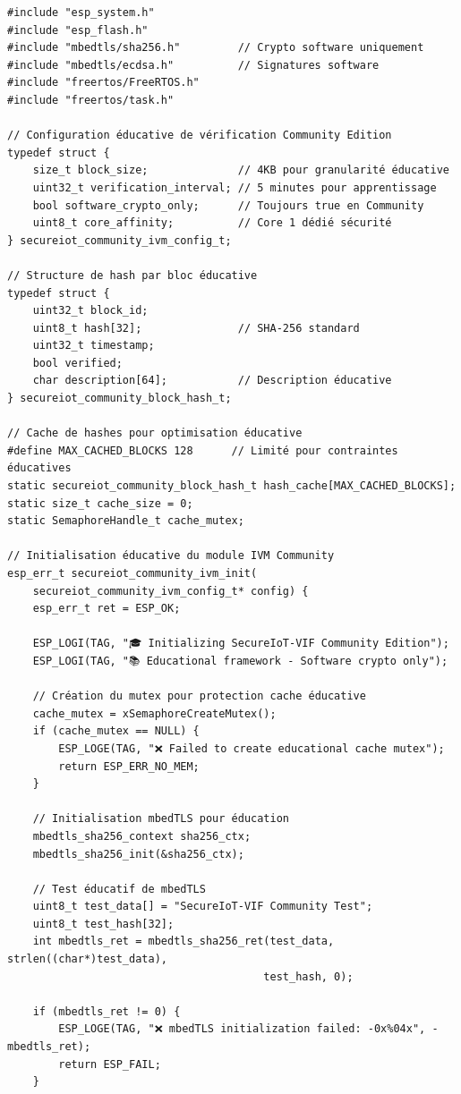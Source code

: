 \lstset{language=C}
\begin{lstlisting}[caption={Implémentation IVM Community utilisant mbedTLS}]
#include "esp_system.h"
#include "esp_flash.h"
#include "mbedtls/sha256.h"         // Crypto software uniquement
#include "mbedtls/ecdsa.h"          // Signatures software
#include "freertos/FreeRTOS.h"
#include "freertos/task.h"

// Configuration éducative de vérification Community Edition
typedef struct {
    size_t block_size;              // 4KB pour granularité éducative
    uint32_t verification_interval; // 5 minutes pour apprentissage
    bool software_crypto_only;      // Toujours true en Community
    uint8_t core_affinity;          // Core 1 dédié sécurité
} secureiot_community_ivm_config_t;

// Structure de hash par bloc éducative
typedef struct {
    uint32_t block_id;
    uint8_t hash[32];               // SHA-256 standard
    uint32_t timestamp;
    bool verified;
    char description[64];           // Description éducative
} secureiot_community_block_hash_t;

// Cache de hashes pour optimisation éducative
#define MAX_CACHED_BLOCKS 128      // Limité pour contraintes éducatives
static secureiot_community_block_hash_t hash_cache[MAX_CACHED_BLOCKS];
static size_t cache_size = 0;
static SemaphoreHandle_t cache_mutex;

// Initialisation éducative du module IVM Community
esp_err_t secureiot_community_ivm_init(
    secureiot_community_ivm_config_t* config) {
    esp_err_t ret = ESP_OK;
    
    ESP_LOGI(TAG, "🎓 Initializing SecureIoT-VIF Community Edition");
    ESP_LOGI(TAG, "📚 Educational framework - Software crypto only");
    
    // Création du mutex pour protection cache éducative
    cache_mutex = xSemaphoreCreateMutex();
    if (cache_mutex == NULL) {
        ESP_LOGE(TAG, "❌ Failed to create educational cache mutex");
        return ESP_ERR_NO_MEM;
    }
    
    // Initialisation mbedTLS pour éducation
    mbedtls_sha256_context sha256_ctx;
    mbedtls_sha256_init(&sha256_ctx);
    
    // Test éducatif de mbedTLS
    uint8_t test_data[] = "SecureIoT-VIF Community Test";
    uint8_t test_hash[32];
    int mbedtls_ret = mbedtls_sha256_ret(test_data, strlen((char*)test_data), 
                                        test_hash, 0);
    
    if (mbedtls_ret != 0) {
        ESP_LOGE(TAG, "❌ mbedTLS initialization failed: -0x%04x", -mbedtls_ret);
        return ESP_FAIL;
    }
    

\end{lstlisting}
